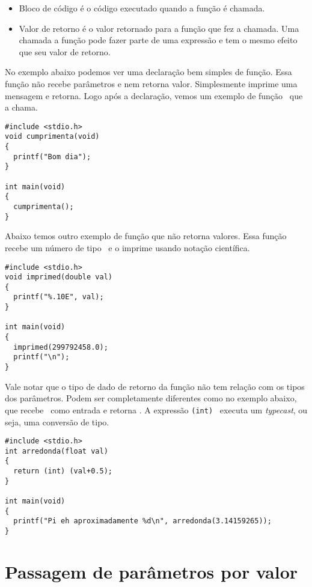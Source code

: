 \begin{itemize}
\item Bloco de código é o código executado quando a função é chamada.

\item Valor de retorno é o valor retornado para a função que fez a chamada. Uma chamada a função pode fazer parte de uma expressão e tem o mesmo efeito que seu valor de retorno.

\end{itemize}

No exemplo abaixo podemos ver uma declaração bem simples de função. Essa função não recebe parâmetros e nem retorna valor. Simplesmente imprime uma mensagem e retorna. Logo após a declaração, vemos um exemplo de função \MAIN\ que a chama.

\begin{lstlisting}
#include <stdio.h>
void cumprimenta(void)
{
  printf("Bom dia");
}

int main(void)
{
  cumprimenta();
}
\end{lstlisting}

Abaixo temos outro exemplo de função que não retorna valores. Essa função recebe um número de tipo \DOUBLE\ e o imprime usando notação científica.

\begin{lstlisting}
#include <stdio.h>
void imprimed(double val)
{
  printf("%.10E", val);
}

int main(void)
{
  imprimed(299792458.0);
  printf("\n");
}
\end{lstlisting}

Vale notar que o tipo de dado de retorno da função não tem relação com os tipos dos parâmetros. Podem ser completamente diferentes como no exemplo abaixo, que recebe \FLOAT\ como entrada e retorna \INT. A expressão {\tt (int) } executa um {\it typecast}, ou seja, uma conversão de tipo. 

\begin{lstlisting}
#include <stdio.h>
int arredonda(float val)
{
  return (int) (val+0.5);
}

int main(void)
{
  printf("Pi eh aproximadamente %d\n", arredonda(3.14159265));
}
\end{lstlisting}


\section{Passagem de parâmetros por valor}

